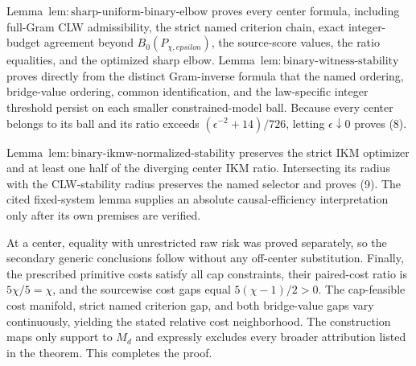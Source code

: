 Lemma~\(\mathrm{lem{:}sharp\text{-}uniform\text{-}binary\text{-}elbow}\) proves every center formula, including full-Gram CLW admissibility, the strict named criterion chain, exact integer-budget agreement beyond \(B_0(P_{\chi,epsilon})\), the source-score values, the ratio equalities, and the optimized sharp elbow. Lemma~\(\mathrm{lem{:}binary\text{-}witness\text{-}stability}\) proves directly from the distinct Gram-inverse formula that the named ordering, bridge-value ordering, common identification, and the law-specific integer threshold persist on each smaller constrained-model ball. Because every center belongs to its ball and its ratio exceeds \((\epsilon^{-2}+14)/726\), letting \(\epsilon\downarrow0\) proves (8).

Lemma~\(\mathrm{lem{:}binary\text{-}ikmw\text{-}normalized\text{-}stability}\) preserves the strict IKM optimizer and at least one half of the diverging center IKM ratio. Intersecting its radius with the CLW-stability radius preserves the named selector and proves (9). The cited fixed-system lemma supplies an absolute causal-efficiency interpretation only after its own premises are verified.

At a center, equality with unrestricted raw risk was proved separately, so the secondary generic conclusions follow without any off-center substitution. Finally, the prescribed primitive costs satisfy all cap constraints, their paired-cost ratio is \(5\chi/5=\chi\), and the sourcewise cost gaps equal \(5(\chi-1)/2>0\). The cap-feasible cost manifold, strict named criterion gap, and both bridge-value gaps vary continuously, yielding the stated relative cost neighborhood. The construction maps only support to \(M_d\) and expressly excludes every broader attribution listed in the theorem. This completes the proof.